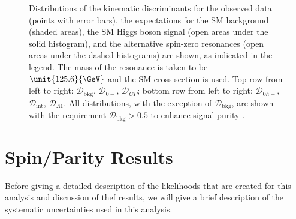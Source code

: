 \begin{figure}
\caption[Distributions of the kinematic discriminants for
the observed data (points with error bars), the expectations for the SM background (shaded areas),
the SM Higgs boson signal (open areas under the solid histogram),
and the alternative spin-zero resonances (open areas under the dashed histograms) are shown,
as indicated in the legend.
The mass of the resonance is taken to be $\unit{125.6}{\GeV}$ and the SM cross section is used.
Top row from left to right:
$\mathcal{D}_\text{bkg}$,
$\mathcal{D}_{0-}$,
$\mathcal{D}_{C\!P}$;
bottom row from left to right:
$\mathcal{D}_{0h+}$,
$\mathcal{D}_\text{int}$,
$\mathcal{D}_{\Lambda1}$.
All distributions, with the exception of $\mathcal{D}_\text{bkg}$, are shown
with the requirement $\mathcal{D}_\text{bkg}>0.5$ to enhance signal purity.]{
Distributions of the kinematic discriminants for
the observed data (points with error bars), the expectations for the SM background (shaded areas),
the SM Higgs boson signal (open areas under the solid histogram),
and the alternative spin-zero resonances (open areas under the dashed histograms) are shown,
as indicated in the legend.
The mass of the resonance is taken to be $\unit{125.6}{\GeV}$ and the SM cross section is used.
Top row from left to right:
$\mathcal{D}_\text{bkg}$,
$\mathcal{D}_{0-}$,
$\mathcal{D}_{C\!P}$;
bottom row from left to right:
$\mathcal{D}_{0h+}$,
$\mathcal{D}_\text{int}$,
$\mathcal{D}_{\Lambda1}$.
All distributions, with the exception of $\mathcal{D}_\text{bkg}$, are shown
with the requirement $\mathcal{D}_\text{bkg}>0.5$ to enhance signal purity \cite{Khachatryan:2014kca}.
}
\label{fig:discriminants}

\end{figure}


\section{Spin/Parity Results}
\label{sec:SpinParity_Results}

Before giving a detailed description of the likelihoods that are created for this analysis and discussion of thef results, we will give a brief description of the systematic uncertainties used in this analysis.

